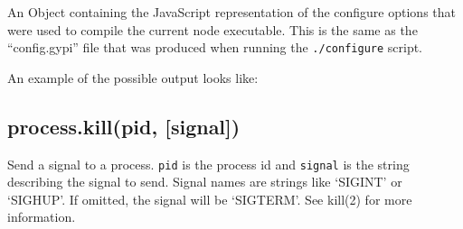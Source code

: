 An Object containing the JavaScript representation of the configure
options that were used to compile the current node executable. This is
the same as the ``config.gypi'' file that was produced when running the
\texttt{./configure} script.

An example of the possible output looks like:

\begin{Shaded}
\begin{Highlighting}[]
\NormalTok{\{ }\NormalTok{:}
   \NormalTok{\{ }\NormalTok{: [],}
     \NormalTok{: }\NormalTok{,}
     \NormalTok{: [],}
     \NormalTok{: [],}
     \NormalTok{: [] \},}
  \NormalTok{:}
   \NormalTok{\{ }\NormalTok{: }\NormalTok{,}
     \NormalTok{: }\NormalTok{,}
     \NormalTok{: }\NormalTok{,}
     \NormalTok{: }\NormalTok{,}
     \NormalTok{: }\NormalTok{,}
     \NormalTok{: }\NormalTok{,}
     \NormalTok{: }\NormalTok{,}
     \NormalTok{: }\NormalTok{,}
     \NormalTok{: }\NormalTok{,}
     \NormalTok{: }\NormalTok{,}
     \NormalTok{: }\NormalTok{,}
     \NormalTok{: }\NormalTok{,}
     \NormalTok{: }\NormalTok{,}
     \NormalTok{: } \NormalTok{\} \}}
\end{Highlighting}
\end{Shaded}

\subsection{process.kill(pid, {[}signal{]})}

Send a signal to a process. \texttt{pid} is the process id and
\texttt{signal} is the string describing the signal to send. Signal
names are strings like `SIGINT' or `SIGHUP'. If omitted, the signal will
be `SIGTERM'. See kill(2) for more information.

